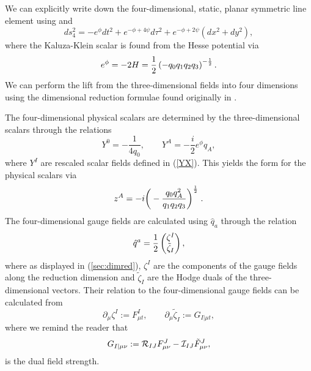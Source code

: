 We can explicitly write down the four-dimensional, static, planar symmetric line element using  and 
\begin{equation}
\label{eq:ansatz}
ds_4^2 = -e^\phi dt^2 + e^{-\phi + 4\psi}d\tau^2 + e^{-\phi + 2\psi} (dx^2 + dy^2),
\end{equation}
where the Kaluza-Klein scalar is found from the Hesse potential via 
\begin{equation*}
	e^\phi = -2H = \frac{1}{2} \left(-q_0 q_1 q_2 q_3 \right)^{-\frac{1}{2}}.
\end{equation*}
We can perform the lift from the three-dimensional fields into four dimensions using the dimensional reduction formulae found originally in \cite{Mohaupt:2011aa,Errington:2014bta,Dempster:2015}.

The four-dimensional physical scalars are determined by the three-dimensional scalars through the relations \cite{Errington:2014bta}
\begin{equation}
Y^0 = -\frac{1}{4q_0}, \qquad Y^A = -\frac{i}{2}e^\phi q_A,
\end{equation}
where $Y^I$ are rescaled scalar fields defined in (\ref{YX}). This yields the form for the physical scalars via 
\begin{equation}
\label{eq:gensca}
z^A = -i \bigg( -\frac{q_0 q_A^2}{q_1 q_2 q_3} \bigg)^{\frac{1}{2}} \; .
\end{equation}
The four-dimensional gauge fields are calculated using $\hat{q}_a$ through the relation
\begin{equation}
\label{eq:gauge1}
    \hat{q}^a = \frac{1}{2} \begin{pmatrix} \zeta^I \\ \tilde{\zeta}_I \end{pmatrix},
\end{equation}
where as displayed in (\ref{sec:dimred}), $\zeta^I$ are the components of the gauge fields along the reduction dimension and $\tilde{\zeta}_I$ are the Hodge duals of the three-dimensional vectors. Their relation to the four-dimensional gauge fields can be calculated from \cite{Errington:2014bta}
\begin{equation}
\label{eq:gauge2}
    \partial_\mu \zeta^I := F_{\mu t}^I, \qquad \partial_\mu \tilde{\zeta}_I := G_{I | \mu t},
\end{equation}
where we remind the reader that
\begin{equation}
\label{eq:gauge3}
    G_{I|\mu \nu} := \mathcal{R}_{IJ} F^J_{\mu \nu} - {\cal I}_{IJ} \tilde{F}^J_{\mu \nu},
\end{equation}
is the dual field strength.

